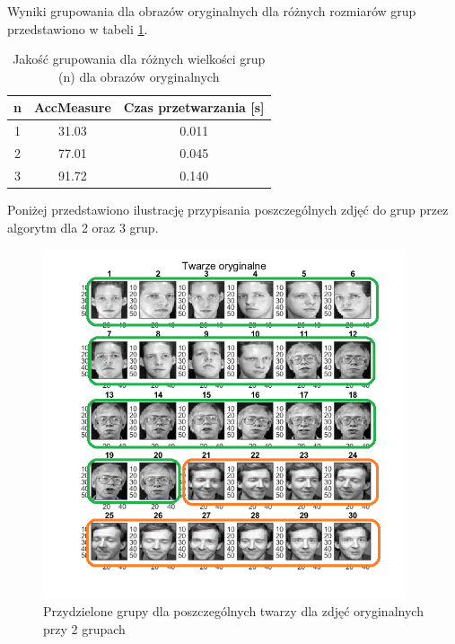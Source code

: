\documentclass[11pt, a4paper]{article}
\newcommand{\fbi}{\leavevmode{\parindent=1em\indent}}
\begin{document}


Wyniki grupowania dla obrazów oryginalnych dla różnych rozmiarów grup przedstawiono w tabeli \ref{tab:wynikiGrupowaniaZwykle}.

\begin{table}[H]
	\centering
	\caption{Jakość grupowania dla różnych wielkości grup (n) dla obrazów oryginalnych}
	\begin{tabular}{|c|c|c|}
		\hline 
		n & AccMeasure & Czas przetwarzania [s] \\ 
		\hline
		1 & 31.03 & 0.011 \\
		\hline
		2 & 77.01 & 0.045 \\
		\hline
		3 & 91.72 & 0.140 \\
		\hline
	\end{tabular}
	\label{tab:wynikiGrupowaniaZwykle}
\end{table}

\fbi
Poniżej przedstawiono ilustrację przypisania poszczególnych zdjęć do grup przez algorytm dla 2 oraz 3 grup.

\begin{figure}[H]
	\centering
	\includegraphics[width=0.95\textwidth]{./assets/ilustracja_zad2_dane_pogrupowane_2.png}
	\caption{Przydzielone grupy dla poszczególnych twarzy dla zdjęć oryginalnych przy 2 grupach}
	\label{fig:ilustracja_zad2_dane_pogrupowane_2}
\end{figure}
\end{document}
